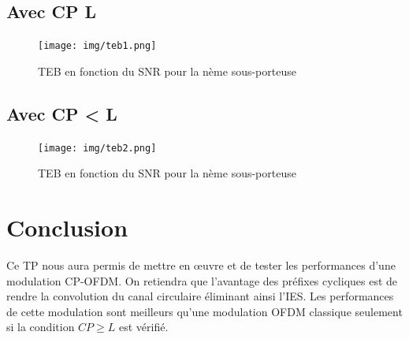 \documentclass[11pt]{article}
\begin{document}
		\subsection{Avec CP \geq L}
		
		\begin{figure}[h]
			\centering
			\texttt{[image: img/teb1.png]}
			\caption{TEB en fonction du SNR pour la nème sous-porteuse}
			\label{teb1}
		\end{figure}
		
		\subsection{Avec CP < L}

		\begin{figure}[h]
			\centering
			\texttt{[image: img/teb2.png]}
			\caption{TEB en fonction du SNR pour la nème sous-porteuse}
			\label{teb2}
		\end{figure}
		
		\section{Conclusion}
		Ce TP nous aura permis de mettre en œuvre et de tester les performances d'une modulation CP-OFDM. On retiendra que l'avantage des préfixes cycliques est de rendre la convolution du canal circulaire éliminant ainsi l'IES. Les performances de cette modulation sont meilleurs qu'une modulation OFDM classique seulement si la condition $CP \geq L$ est vérifié.
\end{document}
